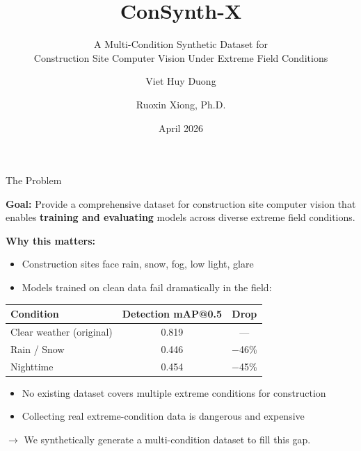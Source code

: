 \documentclass[aspectratio=169, 11pt]{beamer}
\title{ConSynth-X}
\subtitle{A Multi-Condition Synthetic Dataset for\\Construction Site Computer Vision Under Extreme Field Conditions}
\author{Viet Huy Duong \and Ruoxin Xiong, Ph.D.}
\institute{Kent State University}
\date{April 2026}
\begin{document}

\begin{frame}
\titlepage
\end{frame}

\begin{frame}{The Problem}

\textbf{Goal:} Provide a comprehensive dataset for construction site computer vision that enables \textbf{training and evaluating} models across diverse extreme field conditions.

\vspace{0.6em}
\textbf{Why this matters:}
\begin{itemize}\setlength\itemsep{0.15em}
    \item Construction sites face rain, snow, fog, low light, glare
    \item Models trained on clean data fail dramatically in the field:
\end{itemize}

\vspace{0.2em}
\centering
\footnotesize
\begin{tabular}{lcc}
\toprule
\textbf{Condition} & \textbf{Detection mAP@0.5} & \textbf{Drop} \\
\midrule
Clear weather (original) & 0.819 & --- \\
Rain / Snow & 0.446 & {\color{warnred}$-$46\%} \\
Nighttime & 0.454 & {\color{warnred}$-$45\%} \\
\bottomrule
\end{tabular}

\vspace{0.6em}
\raggedright
\begin{itemize}\setlength\itemsep{0.15em}
    \item No existing dataset covers multiple extreme conditions for construction
    \item Collecting real extreme-condition data is dangerous and expensive
\end{itemize}

\vspace{0.3em}
$\to$ We synthetically generate a multi-condition dataset to fill this gap.
\end{frame}
\end{document}
